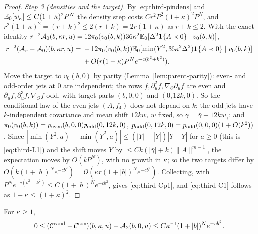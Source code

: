 \begin{proof}
\emph{Step 3 (densities and the target).} By \eqref{eq:third-pindens} and $\mathbb E_0[w_\kappa]\le C(1+\kappa)^2P^N$ the density step costs $Cr^2P^2(1+\kappa)^2P^N$, and $r^2(1+\kappa)^2=(r+k)^2\le2(r+k)=2r(1+\kappa)$ as $r+k\le2$. With the exact identity $r^{-2}\mathcal A_0(b,\kappa r,u)=12\pi_0(v_0(b,k))36\kappa^2\mathbb E_0[\Delta^2\mathbf 1\{A\prec0\}\mid v_0(b,k)]$,
\[
\begin{aligned}
r^{-2}(\mathcal A_r-\mathcal A_0)(b,\kappa r,u)={}&-12\pi_0(v_0(b,k))\mathbb E_0[\min(Y^2,36\kappa^2\Delta^2)\mathbf 1\{A\prec0\}\mid v_0(b,k)]\\
&+O(r(1+\kappa)P^Ne^{-c(b^2+k^2)}).
\end{aligned}
\]
Move the target to $v_0(b,0)$ by parity \cite{parentP} (Lemma~\ref{lem:parent-parity}): even- and odd-order jets at $0$ are independent; the rows $f,\partial_u^2f,\nabla_\Theta\partial_uf$ are even and $\partial_uf,\partial_u^3f,\nabla_\Theta f$ odd, with target parts $(b,0,0)$ and $(0,12k,0)$. So the conditional law of the even jets $(A,f_4)$ does not depend on $k$; the odd jets have $k$-independent covariance and mean shift $12kw$, $w$ fixed, so $\gamma=\bar\gamma+12kw_\gamma$; and $\pi_0(v_0(b,k))=p_{\rm even}(b,0,0)p_{\rm odd}(0,12k,0)$, $p_{\rm odd}(0,12k,0)=p_{\rm odd}(0,0,0)(1+O(k^2))$. Since $|\min(Y^2,a)-\min(\bar Y^2,a)|\le(|Y|+|\bar Y|)|Y-\bar Y|$ for $a\ge0$ (this is \eqref{eq:third-L1}) and the shift moves $Y$ by $\le Ck(|\bar\gamma|+k)\|A\|^{m-1}$, the expectation moves by $O(kP^N)$, with no growth in $\kappa$; so the two targets differ by $O(k(1+|b|)^Ne^{-cb^2})=O(\kappa r(1+|b|)^Ne^{-cb^2})$. Collecting, with $P^Ne^{-c(b^2+k^2)}\le C(1+|b|)^Ne^{-cb^2}$, gives \eqref{eq:third-Cp1}, and \eqref{eq:third-C1} follows as $1+\kappa\le(1+\kappa)^2$.
\end{proof}

\begin{lemma}[overlap]\label{lem:third-O}
For $\kappa\ge1$,
\begin{equation}\label{eq:third-O1}
0\le(\mathcal C^{\mathrm{cand}}-\mathcal C^{\rm con})(b,\kappa,u)-\mathcal A_2(b,0,u)\le C\kappa^{-1}(1+|b|)^Ne^{-cb^2}.
\end{equation}
\end{lemma}

